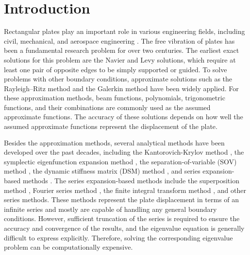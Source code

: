 \documentclass[preprint,12pt]{elsarticle}
\begin{document}
\section{Introduction}
Rectangular plates play an important role in various engineering fields, including civil, mechanical, and aerospace engineering \citep{biancolini2005approximate}. 
The free vibration of plates has been a fundamental research problem for over two centuries. 
The earliest exact solutions for this problem are the Navier \citep{navier1823extrait} and Levy \citep{levy1899equilibre} solutions, which require at least one pair of opposite edges to be simply supported or guided.
To solve problems with other boundary conditions, approximate solutions such as the Rayleigh–Ritz method \cite{leissa1973free} and the Galerkin method \cite{laura1967study} have been widely applied. 
For these approximation methods, beam functions, polynomials, trigonometric functions, and their combinations \cite{li2004vibration} are commonly used as the assumed approximate functions.
The accuracy of these solutions depends on how well the assumed approximate functions represent the displacement of the plate.

Besides the approximation methods, several analytical methods have been developed over the past decades, including the Kantorovich-Krylov method \cite{kantorovich1958approximate,kerr1968extension}, the symplectic eigenfunction expansion method \cite{zhong1995new,xing2009new2}, the separation-of-variable (SOV) method \cite{xing2009new}, the dynamic stiffness matrix (DSM) method \cite{banerjee1997dynamic}, and series expansion-based methods \cite{xing2022review}.
The series expansion-based methods include the superposition method \cite{timoshenko1940theory,gorman2005free}, Fourier series method \cite{khov2009accurate,li2009exact}, the finite integral transform method \cite{li2009finite,zhong2013free}, and other series methods. 
These methods represent the plate displacement in terms of an infinite series and mostly are capable of handling any general boundary conditions. 
However, sufficient truncation of the series is required to ensure the accuracy and convergence of the results, and the eigenvalue equation is generally difficult to express explicitly.
Therefore, solving the corresponding eigenvalue problem can be computationally expensive.
\end{document}
